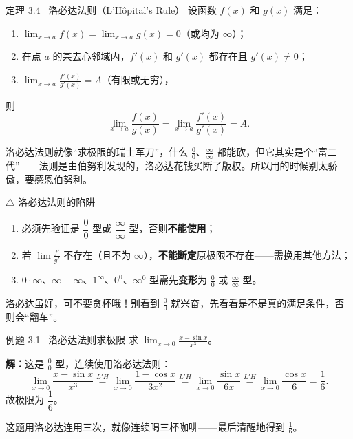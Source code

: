 \documentclass[12pt,a4paper]{article}
\newcommand{\redtext}[1]{{\color{MainRed}\textbf{#1}}}
\newcommand{\purpletext}[1]{{\color{Royal}\textbf{#1}}}
\newcommand{\humor}[1]{\par\smallskip\begin{humorbox}#1\end{humorbox}\smallskip}
\begin{document}
\begin{thmbox}{定理 3.4 \ 洛必达法则（L'Hôpital's Rule）}
设函数 $f(x)$ 和 $g(x)$ 满足：
\begin{enumerate}[leftmargin=2em, itemsep=2pt]
  \item $\displaystyle\lim_{x \to a} f(x) = \lim_{x \to a} g(x) = 0$（或均为 $\infty$）；
  \item 在点 $a$ 的某去心邻域内，$f'(x)$ 和 $g'(x)$ 都存在且 $g'(x) \neq 0$；
  \item $\displaystyle\lim_{x \to a} \frac{f'(x)}{g'(x)} = A$（有限或无穷），
\end{enumerate}
则
\[
\lim_{x \to a} \frac{f(x)}{g(x)} = \lim_{x \to a} \frac{f'(x)}{g'(x)} = A.
\]
\end{thmbox}
\humor{洛必达法则就像“求极限的瑞士军刀”，什么 $\frac{0}{0}$、$\frac{\infty}{\infty}$ 都能砍，但它其实是个“富二代”——法则是由伯努利发现的，洛必达花钱买断了版权。所以用的时候别太骄傲，要感恩伯努利。}

\begin{warnbox}{$\triangle$ 洛必达法则的陷阱}
\begin{enumerate}[leftmargin=2em, itemsep=3pt]
  \item 必须先验证是 $\dfrac{0}{0}$ 型或 $\dfrac{\infty}{\infty}$ 型，否则\redtext{不能使用}；
  \item 若 $\lim \frac{f'}{g'}$ 不存在（且不为 $\infty$），\redtext{不能断定}原极限不存在——需换用其他方法；
  \item $0 \cdot \infty$、$\infty - \infty$、$1^\infty$、$0^0$、$\infty^0$ 型需先\purpletext{变形}为 $\frac{0}{0}$ 或 $\frac{\infty}{\infty}$ 型。
\end{enumerate}
\end{warnbox}
\humor{洛必达虽好，可不要贪杯哦！别看到 $\frac{0}{0}$ 就兴奋，先看看是不是真的满足条件，否则会“翻车”。}

\begin{exbox}{例题 3.1 \ 洛必达法则求极限}
求 $\displaystyle\lim_{x \to 0} \frac{x - \sin x}{x^3}$。

\sffamily\textbf{解：}\normalfont 这是 $\frac{0}{0}$ 型，连续使用洛必达法则：
\[
\lim_{x \to 0} \frac{x - \sin x}{x^3} \stackrel{L'H}{=} \lim_{x \to 0} \frac{1 - \cos x}{3x^2} \stackrel{L'H}{=} \lim_{x \to 0} \frac{\sin x}{6x} \stackrel{L'H}{=} \lim_{x \to 0} \frac{\cos x}{6} = \frac{1}{6}.
\]
故极限为 $\boxed{\dfrac{1}{6}}$。
\end{exbox}
\humor{这题用洛必达连用三次，就像连续喝三杯咖啡——最后清醒地得到 $\frac{1}{6}$。}

\newpage
\end{document}
